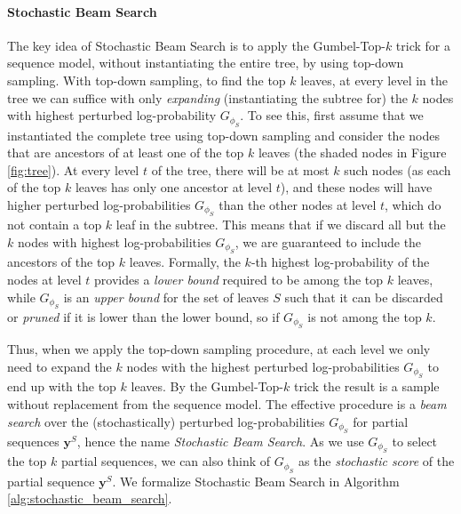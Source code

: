\paragraph{Stochastic Beam Search}
The key idea of Stochastic Beam Search is to apply the Gumbel-Top-$k$ trick for a sequence model, without instantiating the entire tree, by using top-down sampling. With top-down sampling, to find the top $k$ leaves, at every level in the tree we can suffice with only \emph{expanding} (instantiating the subtree for) the $k$ nodes with highest perturbed log-probability $G_{\phi_S}$. To see this, first assume that we instantiated the complete tree using top-down sampling and consider the nodes that are ancestors of at least one of the top $k$ leaves (the shaded nodes in Figure \ref{fig:tree}). At every level $t$ of the tree, there will be at most $k$ such nodes (as each of the top $k$ leaves has only one ancestor at level $t$), and these nodes will have higher perturbed log-probabilities $G_{\phi_S}$ than the other nodes at level $t$, which do not contain a top $k$ leaf in the subtree. This means that if we discard all but the $k$ nodes with highest log-probabilities $G_{\phi_S}$, we are guaranteed to include the ancestors of the top $k$ leaves. Formally, the $k$-th highest log-probability of the nodes at level $t$ provides a \emph{lower bound} required to be among the top $k$ leaves, while $G_{\phi_S}$ is an \emph{upper bound} for the set of leaves $S$ such that it can be discarded or \emph{pruned} if it is lower than the lower bound, so if $G_{\phi_S}$ is not among the top $k$.

Thus, when we apply the top-down sampling procedure, at each level we only need to expand the $k$ nodes with the highest perturbed log-probabilities $G_{\phi_S}$ to end up with the top $k$ leaves. By the Gumbel-Top-$k$ trick the result is a sample without replacement from the sequence model. The effective procedure is a \emph{beam search} over the (stochastically) perturbed log-probabilities $G_{\phi_S}$ for partial sequences $\bm{y}^S$, hence the name \emph{Stochastic Beam Search}. As we use $G_{\phi_S}$ to select the top $k$ partial sequences, we can also think of $G_{\phi_S}$ as the \emph{stochastic score} of the partial sequence $\bm{y}^S$. We formalize Stochastic Beam Search in Algorithm \ref{alg:stochastic_beam_search}.

